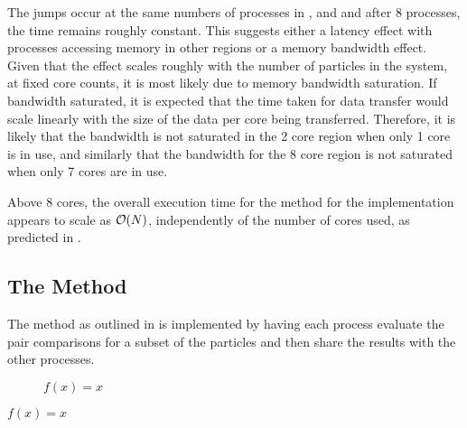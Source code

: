 The jumps occur at the same numbers of processes in
,
 and
and after 8 processes, the time remains roughly constant.
%
This suggests either a latency effect with processes accessing memory
in other \numa{} regions or a memory bandwidth effect.
%
Given that the effect scales roughly with the number of particles
in the system, at fixed core counts, it is most likely due to
memory bandwidth saturation.
%
If bandwidth saturated, it is expected that the time taken for
data transfer would
scale linearly with the size of the data per core being transferred.
%
Therefore, it is likely that the bandwidth is not saturated in
the 2 core \numa{} region
when only 1 core is in use, and
similarly that the bandwidth for
the 8 core \numa{} region is not saturated
when only 7 cores are in use.

Above 8 cores, the overall execution time for
the \individualoperation{} method for the \replicateddata{} implementation
appears to scale as $\mathcal{O}{\left({ N }\right)}$, independently of the number of cores used,
as predicted in
.


%
%

\subsection{The \pairoperation{} Method}

The \pairoperation{} method as outlined in
is implemented by having each process evaluate the pair
comparisons for a subset of the particles and then share the
results with the other processes.

%

%
%
\begin{figure}[!h]
    
    \caption{
        \vZeroSpeedupCaption
            {\replicateddata{}}
            {\pairoperation{}}
            {$f(x) = x$}
    }
    \label{fig:v0_replicated_data_pair_operation_speedups}
\end{figure}


\vZeroSpeedupExplanation
    {}
    {\replicateddata{}}
    {\pairoperation{}}
    {$f(x) = x$}


